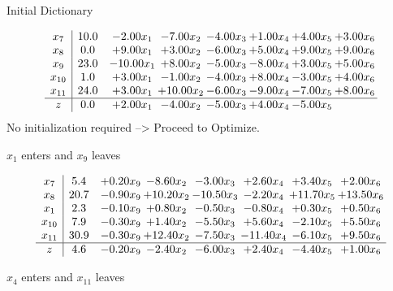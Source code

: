 \documentclass[8pt]{article}
\begin{document}
Initial Dictionary 

\[\begin{array}{c| c c@{\hskip 2pt} c@{\hskip 2pt} c@{\hskip 2pt} c@{\hskip 2pt} c@{\hskip 2pt} c@{\hskip 2pt} }
 x_{7}   &  10.0 & -2.00 x_{1} & -7.00 x_{2} & -4.00 x_{3} & +  1.00 x_{4} & +  4.00 x_{5} & +  3.00 x_{6}\\
 x_{8}   &  0.0 & +  9.00 x_{1} & +  3.00 x_{2} & -6.00 x_{3} & +  5.00 x_{4} & +  9.00 x_{5} & +  9.00 x_{6}\\
 x_{9}   &  23.0 & -10.00 x_{1} & +  8.00 x_{2} & -5.00 x_{3} & -8.00 x_{4} & +  3.00 x_{5} & +  5.00 x_{6}\\
 x_{10}   &  1.0 & +  3.00 x_{1} & -1.00 x_{2} & -4.00 x_{3} & +  8.00 x_{4} & -3.00 x_{5} & +  4.00 x_{6}\\
 x_{11}   &  24.0 & +  3.00 x_{1} & + 10.00 x_{2} & -6.00 x_{3} & -9.00 x_{4} & -7.00 x_{5} & +  8.00 x_{6}\\
\hline
z    &  0.0 & +  2.00 x_{1} & -4.00 x_{2} & -5.00 x_{3} & +  4.00 x_{4} & -5.00 x_{5} &   \\
\end{array}\]
No initialization required --> Proceed to Optimize. 


 $ x_{1} $ enters and $ x_{9} $ leaves 

 \[\begin{array}{c| c c@{\hskip 2pt} c@{\hskip 2pt} c@{\hskip 2pt} c@{\hskip 2pt} c@{\hskip 2pt} c@{\hskip 2pt} }
 x_{7}   &  5.4 & +  0.20 x_{9} & -8.60 x_{2} & -3.00 x_{3} & +  2.60 x_{4} & +  3.40 x_{5} & +  2.00 x_{6}\\
 x_{8}   &  20.7 & -0.90 x_{9} & + 10.20 x_{2} & -10.50 x_{3} & -2.20 x_{4} & + 11.70 x_{5} & + 13.50 x_{6}\\
 x_{1}   &  2.3 & -0.10 x_{9} & +  0.80 x_{2} & -0.50 x_{3} & -0.80 x_{4} & +  0.30 x_{5} & +  0.50 x_{6}\\
 x_{10}   &  7.9 & -0.30 x_{9} & +  1.40 x_{2} & -5.50 x_{3} & +  5.60 x_{4} & -2.10 x_{5} & +  5.50 x_{6}\\
 x_{11}   &  30.9 & -0.30 x_{9} & + 12.40 x_{2} & -7.50 x_{3} & -11.40 x_{4} & -6.10 x_{5} & +  9.50 x_{6}\\
\hline
z    &  4.6 & -0.20 x_{9} & -2.40 x_{2} & -6.00 x_{3} & +  2.40 x_{4} & -4.40 x_{5} & +  1.00 x_{6}\\
\end{array}\]


 $ x_{4} $ enters and $ x_{11} $ leaves 
\end{document}
